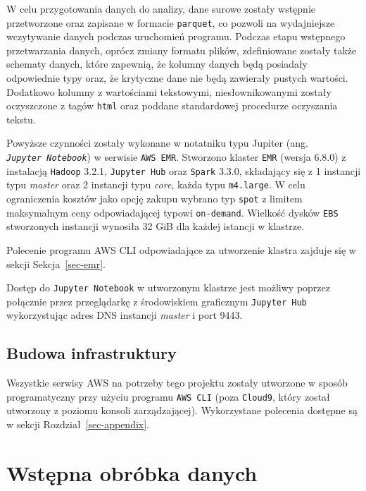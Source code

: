 \documentclass[
  letterpaper,
  DIV=11,
  numbers=noendperiod]{scrreprt}
\begin{document}
W celu przygotowania danych do analizy, dane surowe zostały wstępnie
przetworzone oraz zapisane w formacie \texttt{parquet}, co pozwoli na
wydajniejsze wczytywanie danych podczas uruchomień programu. Podczas
etapu wstępnego przetwarzania danych, oprócz zmiany formatu plików,
zdefiniowane zostały także schematy danych, które zapewnią, że kolumny
danych będą posiadały odpowiednie typy oraz, że krytyczne dane nie będą
zawierały pustych wartości. Dodatkowo kolumny z wartościami tekstowymi,
niesłownikowanymi zostały oczyszczone z tagów \texttt{html} oraz poddane
standardowej procedurze oczyszania tekstu.

Powyższe czynności zostały wykonane w notatniku typu Jupiter (ang.
\emph{\texttt{Jupyter\ Notebook}}) w serwisie \texttt{AWS\ EMR}.
Stworzono klaster \texttt{EMR} (wersja 6.8.0) z instalacją
\texttt{Hadoop} 3.2.1, \texttt{Jupyter\ Hub} oraz \texttt{Spark} 3.3.0,
składający się z 1 instancji typu \emph{master} oraz 2 instancji typu
\emph{core}, każda typu \texttt{m4.large}. W celu ograniczenia kosztów
jako opcję zakupu wybrano typ \texttt{spot} z limitem maksymalnym ceny
odpowiadającej typowi \texttt{on-demand}. Wielkość dysków \texttt{EBS}
stworzonych instancji wynosiła 32 GiB dla każdej istancji w klastrze.

Polecenie programu AWS CLI odpowiadające za utworzenie klastra zajduje
się w sekcji Sekcja~\ref{sec-emr}.

Dostęp do \texttt{Jupyter\ Notebook} w utworzonym klastrze jest możliwy
poprzez połącznie przez przeglądarkę z środowiskiem graficznym
\texttt{Jupyter\ Hub} wykorzystując adres DNS instancji \emph{master} i
port 9443.

\hypertarget{budowa-infrastruktury}{%
\section{Budowa infrastruktury}\label{budowa-infrastruktury}}

Wszystkie serwisy AWS na potrzeby tego projektu zostały utworzone w
sposób programatyczny przy użyciu programu \texttt{AWS\ CLI} (poza
\texttt{Cloud9}, który został utworzony z poziomu konsoli
zarządzającej). Wykorzystane polecenia dostępne są w sekcji
Rozdział~\ref{sec-appendix}.

\hypertarget{wstux119pna-obruxf3bka-danych}{%
\chapter{Wstępna obróbka danych}\label{wstux119pna-obruxf3bka-danych}}
\end{document}
